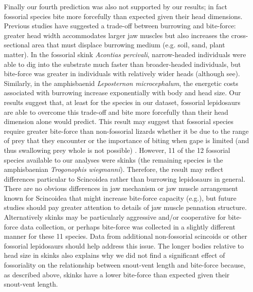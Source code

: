 \documentclass[a4paper, 12pt]{article}
\begin{document}
Finally our fourth prediction was also not supported by our results; in fact fossorial species bite more forcefully than expected given their head dimensions.
Previous studies have suggested a trade-off between burrowing and bite-force: greater head width accommodates larger jaw muscles but also increases the cross-sectional area that must displace burrowing medium (e.g. soil, sand, plant matter)\cite{navas2004morphological,vanhooydonck2011push}. 
In the fossorial skink \textit{Acontias percivali}, narrow-headed individuals were able to dig into the substrate much faster than broader-headed individuals, but bite-force was greater in individuals with relatively wider heads\cite{vanhooydonck2011push} (although see\cite{le2020trade}).
Similarly, in the amphisbaenid \textit{Leposternon microcephalum}, the energetic costs associated with burrowing increase exponentially with body and head size\cite{navas2004morphological}.
Our results suggest that, at least for the species in our dataset, fossorial lepidosaurs are able to overcome this trade-off and bite more forcefully than their head dimension alone would predict. 
This result may suggest that fossorial species require greater bite-force than non-fossorial lizards whether it be due to the range of prey that they encounter or the importance of biting when gape is limited (and thus swallowing prey whole is not possible) . 
However, 11 of the 12 fossorial species available to our analyses were skinks (the remaining species is the amphisbaenian \textit{Trogonophis wiegmanni}).
Therefore, the result may reflect differences particular to Scincoidea rather than burrowing lepidosaurs in general.
There are no obvious differences in jaw mechanism or jaw muscle arrangement known for Scincoidea that might increase bite-force capacity (e.g.\cite{haas1973muscles,daza2011jaw}), but future studies should pay greater attention to details of jaw muscle pennation structure. 
Alternatively skinks may be particularly aggressive and/or cooperative for bite-force data collection, or perhaps bite-force was collected in a slightly different manner for these 11 species. 
Data from additional non-fossorial scincoids or other fossorial lepidosaurs should help address this issue.
The longer bodies relative to head size in skinks also explains why we did not find a significant effect of fossoriality on the relationship between snout-vent length and bite-force because, as described above, skinks have a lower bite-force than expected given their snout-vent length. 
\end{document}
